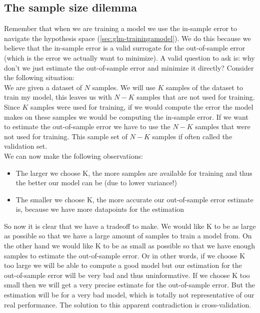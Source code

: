 \subsection{The sample size dilemma}
Remember that when we are training a model we use the in-sample error to navigate the hypothesis space (\ref{sec:glm-trainingamodel}). We do this because we believe that the in-sample error is a valid surrogate for the out-of-sample error (which is the error we actually want to minimize).
A valid question to ask is: why don't we just estimate the out-of-sample error and minimize it directly? Consider the following situation: \\
We are given a dataset of $N$ samples. We will use $K$ samples of the dataset to train my model, this leaves us with $N-K$ samples that are not used for training. Since $K$ samples were used for training, if we would compute the error the model makes on these samples we would be computing the in-sample error. If we want to estimate the out-of-sample error we have to use the $N-K$ samples that were not used for training. This sample set of $N-K$ samples if often called the validation set.\\
We can now make the following observations:
\begin{itemize}
	\item The larger we choose K, the more samples are available for training and thus the better our model can be (due to lower variance!)
	\item The smaller we choose K, the more accurate our out-of-sample error estimate is, because we have more datapoints for the estimation
\end{itemize}
So now it is clear that we have a tradeoff to make. We would like K to be as large as possible so that we have a large amount of samples to train a model from. On the other hand we would like K to be as small as possible so that we have enough samples to estimate the out-of-sample error. Or in other words, if we choose K too large we will be able to compute a good model but our estimation for the out-of-sample error will be very bad and thus uninformative. If we choose K too small then we will get a very precise estimate for the out-of-sample error. But the estimation will be for a very bad model, which is totally not representative of our real performance. The solution to this apparent contradiction is cross-validation.

